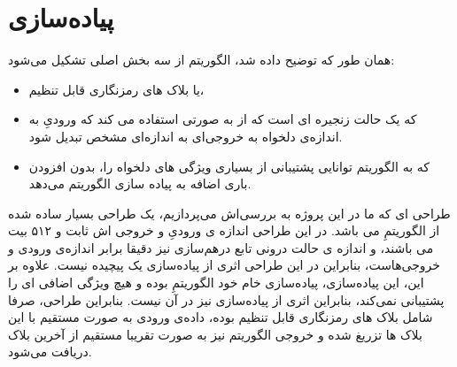 \pagebreak
\section{
	پیاده‌سازی
}
همان طور که توضیح داده شد، الگوریتم 
از سه بخش اصلی تشکیل می‌شود:
\begin{itemize}
	\item 
	یا بلاک های رمزنگاری قابل تنظیم،
	\item
که یک حالت زنجیره ای است که از
به صورتی استفاده می کند که ورودیِ ‌به اندازه‌ی دلخواه به خروجی‌ای به اندازه‌ای مشخص تبدیل شود.
\item
\textbf{ } 
که به الگوریتم توانایی پشتیبانی از بسیاری ویژگی های دلخواه را، بدون افزودن باری اضافه به پیاده سازی الگوریتم می‌دهد.

\end{itemize}

طراحی ای که ما در این پروژه به بررسی‌اش می‌پردازیم، یک طراحی بسیار ساده شده از الگوریتمِ
می باشد. در این طراحی اندازه ی ورودیِ و خروجی اش ثابت و ۵۱۲ بیت می باشند، و اندازه ی حالت درونی تابع درهم‌سازی نیز دقیقا برابر اندازه‌ی ورودی و خروجی‌هاست، بنابراین در این طراحی اثری از پیاده‌سازی یک 
 پیچیده نیست. علاوه‌ بر این، این پیاده‌سازی، پیاده‌سازی خام خود الگوریتمِ
 بوده و هیچ ویژگی اضافی ای را پشتیبانی نمی‌کند، بنابراین اثری از پیاده‌سازی 
نیز در آن نیست. بنابراین طراحی، صرفا شامل بلاک های رمزنگاری قابل تنظیم بوده، داده‌ی ورودی به صورت مستقیم با این بلاک ها تزریغ شده و خروجی الگوریتم نیز به صورت تقریبا مستقیم از آخرین بلاک دریافت می‌شود.


